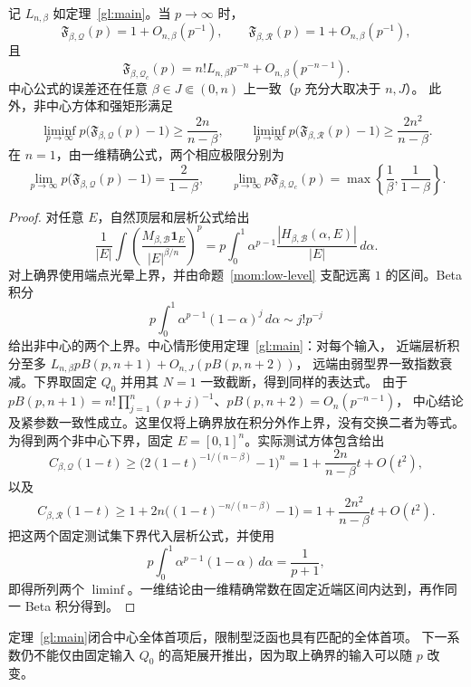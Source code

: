 \begin{theorem}[限制型高矩渐近]\label{mom:restricted-growth}
记 $L_{n,\beta}$ 如定理~\ref{gl:main}。当 $p\to\infty$ 时，
\[
 \mathfrak F_{\beta,\mathcal Q}(p)=1+O_{n,\beta}(p^{-1}),\qquad
 \mathfrak F_{\beta,\mathcal R}(p)=1+O_{n,\beta}(p^{-1}),
\]
且
\[
 \mathfrak F_{\beta,\mathcal Q_c}(p)
 =n!L_{n,\beta}p^{-n}+O_{n,\beta}(p^{-n-1}).
\]
中心公式的误差还在任意 $\beta\in J\Subset(0,n)$ 上一致（$p$ 充分大取决于 $n,J$）。
此外，非中心方体和强矩形满足
\[
 \liminf_{p\to\infty}p\bigl(\mathfrak F_{\beta,\mathcal Q}(p)-1\bigr)
 \ge\frac{2n}{n-\beta},
 \qquad
 \liminf_{p\to\infty}p\bigl(\mathfrak F_{\beta,\mathcal R}(p)-1\bigr)
 \ge\frac{2n^2}{n-\beta}.
\]
在 $n=1$，由一维精确公式，两个相应极限分别为
\[
 \lim_{p\to\infty}p\bigl(\mathfrak F_{\beta,\mathcal Q}(p)-1\bigr)=\frac{2}{1-\beta},
 \qquad
 \lim_{p\to\infty}p\mathfrak F_{\beta,\mathcal Q_c}(p)
 =\max\!\left\{\frac1\beta,\frac1{1-\beta}\right\}.
\]
\end{theorem}
\begin{proof}
对任意 $E$，自然顶层和层析公式给出
\[
 \frac1{|E|}\int\left(\frac{M_{\beta,\mathcal B}\mathbf1_E}{|E|^{\beta/n}}\right)^p
 =p\int_0^1\alpha^{p-1}
 \frac{|H_{\beta,\mathcal B}(\alpha,E)|}{|E|}\,d\alpha.
\]
对上确界使用端点光晕上界，并由命题~\ref{mom:low-level} 支配远离 $1$ 的区间。Beta 积分
\[
 p\int_0^1\alpha^{p-1}(1-\alpha)^j\,d\alpha\sim j!p^{-j}
\]
给出非中心的两个上界。中心情形使用定理~\ref{gl:main}：对每个输入，
近端层析积分至多
$L_{n,\beta}pB(p,n+1)+O_{n,J}(pB(p,n+2))$，
远端由弱型界一致指数衰减。下界取固定 $Q_0$ 并用其 $N=1$ 一致截断，得到同样的表达式。
由于 $pB(p,n+1)=n!\prod_{j=1}^n(p+j)^{-1}$、$pB(p,n+2)=O_n(p^{-n-1})$，
中心结论及紧参数一致性成立。这里仅将上确界放在积分外作上界，没有交换二者为等式。
为得到两个非中心下界，固定 $E=[0,1]^n$。实际测试方体包含给出
\[
 C_{\beta,\mathcal Q}(1-t)\ge
 \bigl(2(1-t)^{-1/(n-\beta)}-1\bigr)^n
 =1+\frac{2n}{n-\beta}t+O(t^2),
\]
以及
\[
 C_{\beta,\mathcal R}(1-t)\ge
 1+2n\bigl((1-t)^{-n/(n-\beta)}-1\bigr)
 =1+\frac{2n^2}{n-\beta}t+O(t^2).
\]
把这两个固定测试集下界代入层析公式，并使用
\[
 p\int_0^1\alpha^{p-1}(1-\alpha)\,d\alpha=\frac1{p+1},
\]
即得所列两个 \(\liminf\)。一维结论由一维精确常数在固定近端区间内达到，再作同一 Beta 积分得到。
\end{proof}

\begin{remark}\label{mom:global-gap}
定理~\ref{gl:main}闭合中心全体首项后，限制型泛函也具有匹配的全体首项。
下一系数仍不能仅由固定输入 $Q_0$ 的高矩展开推出，因为取上确界的输入可以随 $p$ 改变。
\end{remark}

